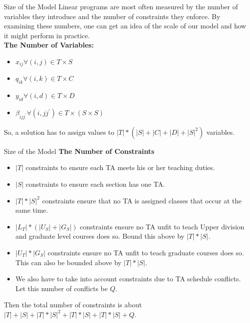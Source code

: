 \documentclass[9pt]{beamer}
\begin{document}
\begin{frame}{Size of the Model}
Linear programs are most often measured by the number of variables they introduce and the number of constraints they enforce. By examining these numbers, one can get an idea of the scale of our model and how it might perform in practice.\\
\vspace{0.1cm}
\pause
\textbf{The Number of Variables:}
\begin{itemize}
    \item $x_{i j} \forall(i, j) \in T \times S$
\item $q_{i k} \forall(i, k) \in T \times C$
\item $y_{i d} \forall(i, d) \in T \times D$
\item $\beta_{i j j^{\prime}} \forall\left(i, j j^{\prime}\right) \in T \times(S \times S)$
\end{itemize}
\pause
So, a solution has to assign values to $ |T|*\left(|S|+|C|+|D|+|S|^{2}\right) $ variables. 
\end{frame} 

\begin{frame}{Size of the Model}
\textbf{The Number of Constraints}
\begin{itemize}
    \item $|T|$ constraints to ensure each TA meets his or her teaching duties.
 \item $|S|$ constraints to ensure each section has one TA.
\item $|T| *|S|^{2}$ constraints ensure that no TA is assigned classes that occur at the same time.
\item $\left|L_{T}\right|*\left(\left|U_{S}\right|+\left|G_{S}\right|\right)$ constraints ensure no TA unfit to teach Upper division and graduate level courses does so. Bound this above by $|T| *|S| $.
\item $\left|U_{T}\right| *\left|G_{S}\right|$ constraints ensure no TA unfit to teach graduate courses does so. This can also be bounded above by $|T| *|S|$.
\item We also have to take into account constraints due to TA schedule conflicts. Let this number of conflicts be $Q$.
\end{itemize}
\pause
Then the total number of constraints is about $|T|+|S|+|T| *|S|^{2} + |T| *|S|+|T| * |S|+ Q $. 
\end{frame} 
\end{document}
